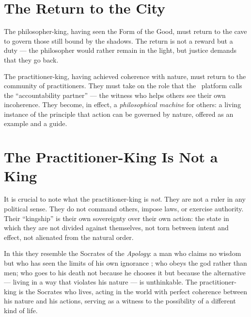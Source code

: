 \section{The Return to the City}

The philosopher-king, having seen the Form of the Good, must return to the cave
to govern those still bound by the shadows. The return is not a reward but a
duty --- the philosopher would rather remain in the light, but justice demands
that they go back.

The practitioner-king, having achieved coherence with nature, must return to
the community of practitioners. They must take on the role that the \praxis\
platform calls the ``accountability partner'' --- the witness who helps others
see their own incoherence. They become, in effect, a \emph{philosophical machine}
for others: a living instance of the principle that action can be governed by
nature, offered as an example and a guide.

\section{The Practitioner-King Is Not a King}

It is crucial to note what the practitioner-king is \emph{not}. They are not a
ruler in any political sense. They do not command others, impose laws, or
exercise authority. Their ``kingship'' is their own sovereignty over their own
action: the state in which they are not divided against themselves, not torn
between intent and effect, not alienated from the natural order.

In this they resemble the Socrates of the \emph{Apology}: a man who claims no
wisdom but who has seen the limits of his own ignorance \parencite{plato1997complete}; who obeys the god
rather than men; who goes to his death not because he chooses it but because
the alternative --- living in a way that violates his nature --- is unthinkable.
The practitioner-king is the Socrates who lives, acting in the world with
perfect coherence between his nature and his actions, serving as a witness to
the possibility of a different kind of life.

